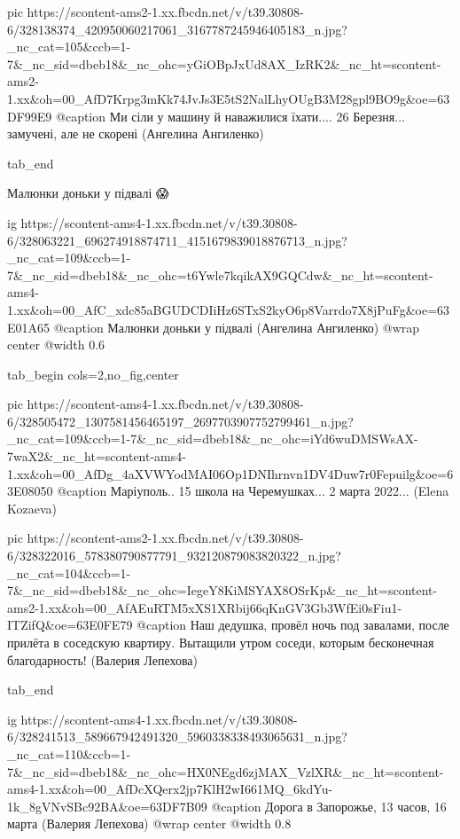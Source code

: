      pic https://scontent-ams2-1.xx.fbcdn.net/v/t39.30808-6/328138374_420950060217061_3167787245946405183_n.jpg?_nc_cat=105&ccb=1-7&_nc_sid=dbeb18&_nc_ohc=yGiOBpJxUd8AX_IzRK2&_nc_ht=scontent-ams2-1.xx&oh=00_AfD7Krpg3mKk74JvJs3E5tS2NalLhyOUgB3M28gpl9BO9g&oe=63DF99E9
     @caption Ми сіли у машину й наважилися їхати.... 26 Березня... замучені, але не скорені (Ангелина Ангиленко)

  tab_end
\fi


Малюнки доньки у підвалі 😱

\ifcmt
  ig https://scontent-ams4-1.xx.fbcdn.net/v/t39.30808-6/328063221_696274918874711_4151679839018876713_n.jpg?_nc_cat=109&ccb=1-7&_nc_sid=dbeb18&_nc_ohc=t6Ywle7kqikAX9GQCdw&_nc_ht=scontent-ams4-1.xx&oh=00_AfC_xdc85aBGUDCDIiHz6STxS2kyO6p8Varrdo7X8jPuFg&oe=63E01A65
  @caption Малюнки доньки у підвалі (Ангелина Ангиленко)
  @wrap center
  @width 0.6
\fi


\ifcmt
  tab_begin cols=2,no_fig,center

     pic https://scontent-ams4-1.xx.fbcdn.net/v/t39.30808-6/328505472_1307581456465197_2697703907752799461_n.jpg?_nc_cat=109&ccb=1-7&_nc_sid=dbeb18&_nc_ohc=iYd6wuDMSWsAX-7waX2&_nc_ht=scontent-ams4-1.xx&oh=00_AfDg_4aXVWYodMAI06Op1DNIhrnvn1DV4Duw7r0Fepuilg&oe=63E08050
     @caption Маріуполь.. 15 школа на Черемушках... 2 марта 2022... (Elena Kozaeva)

     pic https://scontent-ams2-1.xx.fbcdn.net/v/t39.30808-6/328322016_578380790877791_932120879083820322_n.jpg?_nc_cat=104&ccb=1-7&_nc_sid=dbeb18&_nc_ohc=IegeY8KiMSYAX8OSrKp&_nc_ht=scontent-ams2-1.xx&oh=00_AfAEuRTM5xXS1XRbij66qKnGV3Gb3WfEi0sFiu1-ITZifQ&oe=63E0FE79
     @caption Наш дедушка, провёл ночь под завалами, после прилёта в соседскую квартиру. Вытащили утром соседи, которым бесконечная благодарность! (Валерия Лепехова)

  tab_end
\fi


\ifcmt
  ig https://scontent-ams4-1.xx.fbcdn.net/v/t39.30808-6/328241513_589667942491320_5960338338493065631_n.jpg?_nc_cat=110&ccb=1-7&_nc_sid=dbeb18&_nc_ohc=HX0NEgd6zjMAX_VzlXR&_nc_ht=scontent-ams4-1.xx&oh=00_AfDcXQerx2jp7KlH2wI661MQ_6kdYu-1k_8gVNvSBc92BA&oe=63DF7B09
  @caption Дорога в Запорожье, 13 часов, 16 марта (Валерия Лепехова)
  @wrap center
  @width 0.8
\fi






